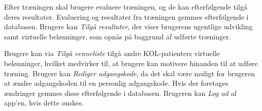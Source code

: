 Efter træningen skal brugere evaluere træningen, og de kan efterfølgende tilgå deres resultater. Evaluering og resultater fra træningen gemmes efterfølgende i databasen. Brugere kan \textit{Tilgå resultater}, der viser brugerens ugentlige udvikling samt virtuelle belønninger, som opnås på baggrund af udførte træninger. 

Brugere kan via \textit{Tilgå venneliste} tilgå andre KOL-patienters virtuelle belønninger, hvilket medvirker til, at brugere kan motivere hinanden til at udføre træning. Brugere kan \textit{Rediger adgangskode}, da det skal være muligt for brugeren at ændre adgangskoden til en personlig adgangskode. Hvis der foretages ændringer gemmes disse efterfølgende i databasen.
Brugeren kan \textit{Log ud} af app'en, hvis dette ønskes. 

%
%
%
%
